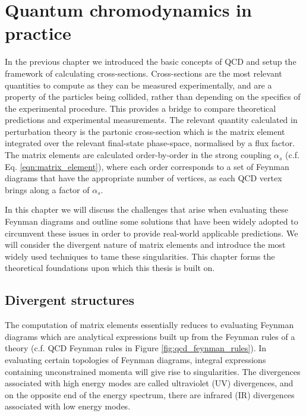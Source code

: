 \documentclass[main.tex]{subfiles}
\begin{document}
\chapter{Quantum chromodynamics in practice}
\label{chapter:qcd}
    In the previous chapter we introduced the basic concepts
    of QCD and setup the framework of calculating
    cross-sections. Cross-sections are the most relevant
    quantities to compute as they can be measured
    experimentally, and are a property of the particles
    being collided, rather than depending on the
    specifics of the experimental procedure.
    This provides a bridge to compare
    theoretical predictions and experimental measurements.
    The relevant quantity calculated in perturbation theory
    is the partonic cross-section which
    is the matrix element integrated over the relevant
    final-state phase-space, normalised by a flux factor.
    The matrix elements are
    calculated order-by-order in the strong coupling
    $\alpha_{s}$ (c.f. Eq. \ref{eqn:matrix_element}),
    where each order corresponds to a set of Feynman diagrams
    that have the appropriate number of vertices,
    as each QCD vertex brings along a factor of $\alpha_{s}$.

    In this chapter we will discuss the challenges that
    arise when evaluating these Feynman diagrams and outline
    some solutions that have been widely adopted to circumvent
    these issues in order to provide real-world applicable predictions.
    We will consider the divergent nature of matrix
    elements and introduce the most widely used techniques
    to tame these singularities.
    This chapter forms the theoretical foundations upon which
    this thesis is built on.


\section{Divergent structures}\label{sec:divergences}
    The computation of matrix elements essentially reduces
    to evaluating Feynman diagrams which are analytical expressions
    built up from the Feynman rules of a theory (c.f. QCD Feynman rules
    in Figure \ref{fig:qcd_feynman_rules}). In evaluating certain
    topologies of Feynman diagrams, integral expressions
    containing unconstrained momenta will give rise to
    singularities. The divergences
    associated with high energy modes are called ultraviolet
    (UV) divergences, and on the opposite end of the energy
    spectrum, there are infrared (IR) divergences associated
    with low energy modes.
\end{document}
